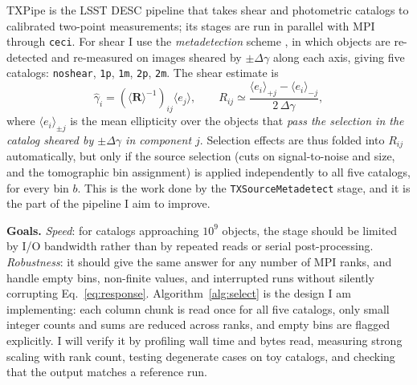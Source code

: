 \documentclass{article}
\begin{document}
TXPipe \citep{prat_catalog_2023} is the LSST DESC pipeline that takes shear and photometric catalogs to calibrated two-point measurements; its stages are run in parallel with MPI through \texttt{ceci}. For shear I use the \emph{metadetection} scheme \citep{sheldon_practical_2017,sheldon_mitigating_2020}, in which objects are re-detected and re-measured on images sheared by $\pm\Delta\gamma$ along each axis, giving five catalogs: \texttt{noshear}, \texttt{1p}, \texttt{1m}, \texttt{2p}, \texttt{2m}. The shear estimate is
\begin{equation}
  \hat{\gamma}_i = \left(\langle\mathbf{R}\rangle^{-1}\right)_{ij}\langle e_j\rangle,
  \qquad
  R_{ij} \simeq \frac{\langle e_i\rangle_{+j} - \langle e_i\rangle_{-j}}{2\,\Delta\gamma}, \label{eq:response}
\end{equation}
where $\langle e_i\rangle_{\pm j}$ is the mean ellipticity over the objects that \emph{pass the selection in the catalog sheared by $\pm\Delta\gamma$ in component $j$}. Selection effects are thus folded into $R_{ij}$ automatically, but only if the source selection (cuts on signal-to-noise and size, and the tomographic bin assignment) is applied independently to all five catalogs, for every bin $b$. This is the work done by the \texttt{TXSourceMetadetect} stage, and it is the part of the pipeline I aim to improve.

\textbf{Goals.} \emph{Speed}: for catalogs approaching $10^{9}$ objects, the stage should be limited by I/O bandwidth rather than by repeated reads or serial post-processing. \emph{Robustness}: it should give the same answer for any number of MPI ranks, and handle empty bins, non-finite values, and interrupted runs without silently corrupting Eq.~\eqref{eq:response}. Algorithm~\ref{alg:select} is the design I am implementing: each column chunk is read once for all five catalogs, only small integer counts and sums are reduced across ranks, and empty bins are flagged explicitly. I will verify it by profiling wall time and bytes read, measuring strong scaling with rank count, testing degenerate cases on toy catalogs, and checking that the output matches a reference run.
\end{document}
